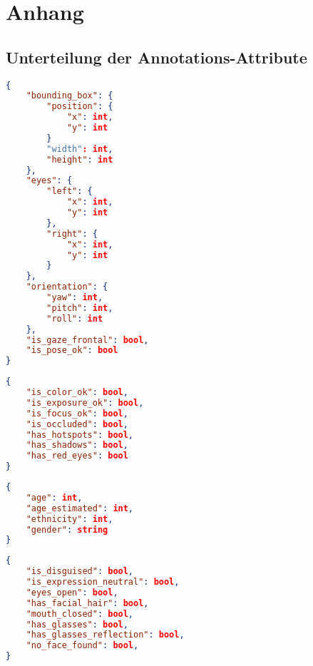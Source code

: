 \appendix
\chapter{Anhang}

\vspace{-1cm}
\section{Unterteilung der Annotations-Attribute}
\label{sec:attribute_grouping}

\vspace{-1cm}
\begin{minipage}[t]{0.47\linewidth}
\begin{lstlisting}[language=json,title=Face Position Orientation]
{
    "bounding_box": {
        "position": {
            "x": int,
            "y": int
        }
        "width": int,
        "height": int
    },
    "eyes": {
        "left": {
            "x": int,
            "y": int
        },
        "right": {
            "x": int,
            "y": int
        }
    },
    "orientation": {
        "yaw": int,
        "pitch": int,
        "roll": int
    },
    "is_gaze_frontal": bool,
    "is_pose_ok": bool
}
\end{lstlisting}
\end{minipage}
%
\hspace{0.01\linewidth}
%
\begin{minipage}[t]{0.47\linewidth}
%
\begin{minipage}[t]{\linewidth}
\begin{lstlisting}[language=json,title=Image Details]
{
    "is_color_ok": bool,
    "is_exposure_ok": bool,
    "is_focus_ok": bool,
    "is_occluded": bool,
    "has_hotspots": bool,
    "has_shadows": bool,
    "has_red_eyes": bool
}
\end{lstlisting}
\end{minipage}
%
\begin{minipage}[t]{\linewidth}
\begin{lstlisting}[language=json,title=Face Demographics]
{
    "age": int,
    "age_estimated": int,
    "ethnicity": int,
    "gender": string
}
\end{lstlisting}
\end{minipage}
%
\begin{minipage}[t]{\linewidth}
\begin{lstlisting}[language=json,title=Face Details]
{
    "is_disguised": bool,
    "is_expression_neutral": bool,
    "eyes_open": bool,
    "has_facial_hair": bool,
    "mouth_closed": bool,
    "has_glasses": bool,
    "has_glasses_reflection": bool,
    "no_face_found": bool,
}
\end{lstlisting}
\end{minipage}
%
\end{minipage}

